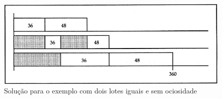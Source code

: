 \begin{figure}[!ht]
    \centering
    \includegraphics[scale=0.4]{Referencial/Figuras/Ls_ex4}
    \caption{Solução para o exemplo com dois lotes iguais e sem ociosidade}
    \label{fig:LS_ex1}
\end{figure}